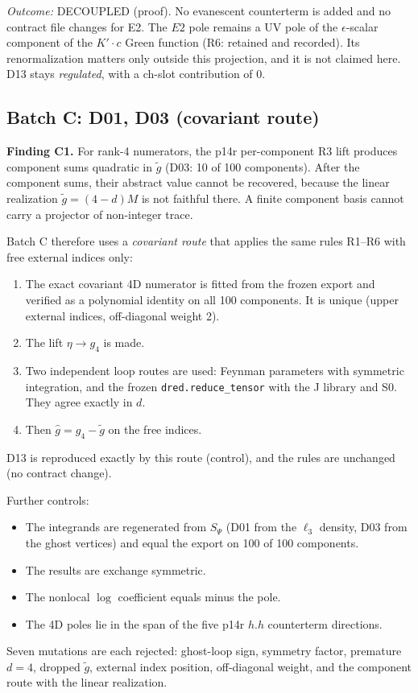 \emph{Outcome:} DECOUPLED (proof). No evanescent counterterm is added and no contract file changes for E2. The $E2$
pole remains a UV pole of the $\epsilon$-scalar component of the $K'\!\cdot c$ Green function (R6: retained and
recorded). Its renormalization matters only outside this projection, and it is not claimed here. D13 stays
\emph{regulated}, with a ch-slot contribution of $0$.

\subsection{Batch C: D01, D03 (covariant route)}
\textbf{Finding C1.} For rank-4 numerators, the p14r per-component R3 lift produces component sums quadratic in
$\tilde g$ (D03: 10 of 100 components). After the component sums, their abstract value cannot be recovered, because
the linear realization $\tilde g=(4-d)M$ is not faithful there. A finite component basis cannot carry a projector of
non-integer trace.

Batch C therefore uses a \emph{covariant route} that applies the same rules R1--R6 with free external indices only:
\begin{enumerate}
\item The exact covariant 4D numerator is fitted from the frozen export and verified as a polynomial identity on all
100 components. It is unique (upper external indices, off-diagonal weight 2).
\item The lift $\eta\to g_4$ is made.
\item Two independent loop routes are used: Feynman parameters with symmetric integration, and the frozen
\texttt{dred.reduce\_tensor} with the J library and S0. They agree exactly in $d$.
\item Then $\hat g=g_4-\tilde g$ on the free indices.
\end{enumerate}
D13 is reproduced exactly by this route (control), and the rules are unchanged (no contract change).

Further controls:
\begin{itemize}
\item The integrands are regenerated from $S_\Psi$ (D01 from the $\ell_3$ density, D03 from the ghost vertices) and
equal the export on 100 of 100 components.
\item The results are exchange symmetric.
\item The nonlocal $\log$ coefficient equals minus the pole.
\item The 4D poles lie in the span of the five p14r $h.h$ counterterm directions.
\end{itemize}
Seven mutations are each rejected: ghost-loop sign, symmetry factor, premature $d=4$, dropped $\tilde g$, external
index position, off-diagonal weight, and the component route with the linear realization.

